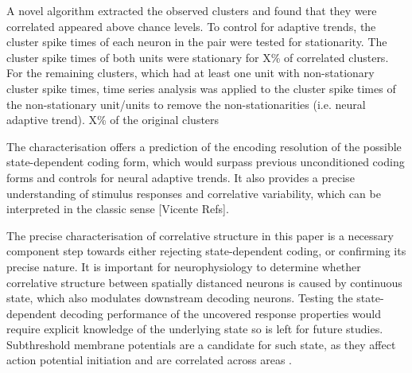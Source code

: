 \documentclass{article}
\begin{document}
A novel algorithm extracted the observed clusters and found that they were correlated appeared above chance levels. To control for adaptive trends, the cluster spike times of each neuron in the pair were tested for stationarity. The cluster spike times of both units were stationary for X\% of correlated clusters. For the remaining clusters, which had at least one unit with non-stationary cluster spike times, time series analysis was applied to the cluster spike times of the non-stationary unit/units to remove the non-stationarities (i.e. neural adaptive trend). X\% of the original clusters 

The characterisation offers a prediction of the encoding resolution of the possible state-dependent coding form, which would surpass previous unconditioned coding forms and controls for neural adaptive trends. It also provides a precise understanding of stimulus responses and correlative variability, which can be interpreted in the classic sense [Vicente Refs].

The precise characterisation of correlative structure in this paper is a necessary component step towards either rejecting state-dependent coding, or confirming its precise nature. It is important for neurophysiology to determine whether correlative structure between spatially distanced neurons is caused by continuous state, which also modulates downstream decoding neurons. Testing the state-dependent decoding performance of the uncovered response properties would require explicit knowledge of the underlying state so is left for future studies.
Subthreshold membrane potentials are a candidate for such state, as they affect action potential initiation \cite{petersen2003interaction} and are correlated across areas \cite{poulet2008internal}.










\end{document}
